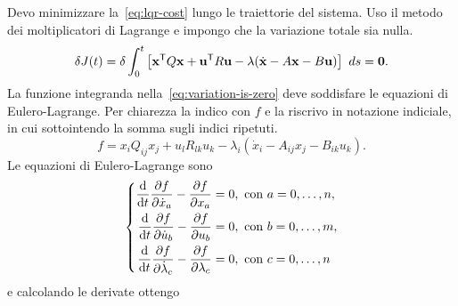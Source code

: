 \label{subsec:derivazione-riccati}
Devo minimizzare la~\eqref{eq:lqr-cost} lungo le traiettorie del sistema.
Uso il metodo dei moltiplicatori di Lagrange e impongo che la variazione totale sia nulla.
\begin{equation*}
    \delta J(t) = \delta \int_0^t
    \left[ \b x^{\T} Q \b x + \b u^\T R \b u  - \b \lambda(\dot{ \b x} - A \b x - B\b u)
    \right]\ ds = \b 0.
    \label{eq:variation-is-zero}
\end{equation*}
La funzione integranda nella~\eqref{eq:variation-is-zero} deve
soddisfare le equazioni di Eulero-Lagrange.
Per chiarezza la indico con $f$ e la riscrivo in notazione indiciale,
in cui sottointendo la somma sugli indici ripetuti.
\begin{equation*}
    f = x_i Q_{ij} x_j + u_l R_{lk} u_k - \lambda_i(\dot x_i - A_{ij} x_j - B_{ik} u_k).
\end{equation*}
Le equazioni di Eulero-Lagrange sono
\begin{equation*}
    \left\{
    \begin{aligned}
        \totald t \partiald{\dot x_a} f - \partiald{x_a} f &= 0, \text{ con } a = 0, \ldots, n, \\
        \totald t \partiald{\dot u_b} f - \partiald{u_b} f &= 0, \text{ con } b = 0, \ldots, m, \\
        \totald t \partiald{\dot \lambda_c} f - \partiald{\lambda_c} f &= 0, \text{ con } c = 0, \ldots, n
    \end{aligned}
    \right.
\end{equation*}
e calcolando le derivate ottengo

